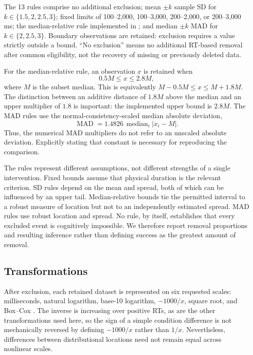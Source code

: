 The 13 rules comprise no additional exclusion; mean \(\pm k\) sample SD for
\(k\in\{1.5,2,2.5,3\}\); fixed limits of 100--2,000, 100--3,000,
200--2,000, or 200--3,000 ms; the median-relative rule implemented in
\rtprocess; and median \(\pm k\) MAD for \(k\in\{2,2.5,3\}\).
Boundary observations are retained: exclusion requires a value strictly
outside a bound. ``No exclusion'' means no additional RT-based removal after
common eligibility, not the recovery of missing or previously deleted data.

For the median-relative rule, an observation \(x\) is retained when
\[
            0.5M \leq x \leq 2.8M,
\]
where \(M\) is the subset median. This is equivalently
\(M-0.5M \leq x \leq M+1.8M\). The distinction between an additive
distance of \(1.8M\) above the median and an upper multiplier of \(1.8\)
is important: the implemented upper bound is \(2.8M\).
The MAD rules use the normal-consistency-scaled median absolute deviation,
\[
       \operatorname{MAD}=1.4826\,
          \operatorname{median}_i|x_i-M|.
\]
Thus, the numerical MAD multipliers do not refer to an unscaled absolute
deviation. Explicitly stating that constant is necessary for reproducing
the comparison.

The rules represent different assumptions, not different strengths of a
single intervention. Fixed bounds assume that physical duration is the
relevant criterion. SD rules depend on the mean and spread, both of which
can be influenced by an upper tail. Median-relative bounds tie the
permitted interval to a robust measure of location but not to an
independently estimated spread. MAD rules use robust location and spread.
No rule, by itself, establishes that every excluded event is cognitively
impossible. We therefore report removal proportions and resulting inference
rather than defining success as the greatest amount of removal.

\subsection{Transformations}

After exclusion, each retained dataset is represented on six requested
scales: milliseconds, natural logarithm, base-10 logarithm,
\(-1000/x\), square root, and Box--Cox
\citep{box_analysis_1964}. The inverse is increasing over positive RTs,
as are the other transformations used here, so the sign of a simple
condition difference is not mechanically reversed by defining
\(-1000/x\) rather than \(1/x\). Nevertheless, differences between
distributional locations need not remain equal across nonlinear scales.

